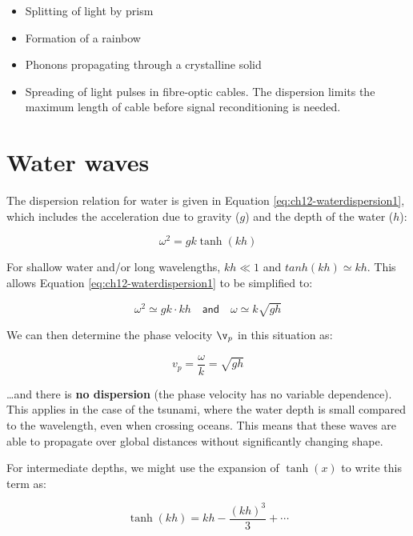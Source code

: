 \documentclass[
]{book}
\providecommand{\tightlist}{%
  \setlength{\itemsep}{0pt}\setlength{\parskip}{0pt}}
\begin{document}
\begin{itemize}
\tightlist
\item
  Splitting of light by prism
\item
  Formation of a rainbow
\item
  Phonons propagating through a crystalline solid
\item
  Spreading of light pulses in fibre-optic cables. The dispersion limits the maximum length of cable before signal reconditioning is needed.
\end{itemize}

\hypertarget{sec:ch12-waterwaves}{%
\section{Water waves}\label{sec:ch12-waterwaves}}

The dispersion relation for water is given in Equation \eqref{eq:ch12-waterdispersion1}, which includes the acceleration due to gravity (\(g\)) and the depth of the water (\(h\)):

\begin{equation}
\omega^2 = gk\tanh(kh)
\label{eq:ch12-waterdispersion1}
\end{equation}

For shallow water and/or long wavelengths, \(kh \ll 1\) and \(tanh(kh) \simeq kh\). This allows Equation \eqref{eq:ch12-waterdispersion1} to be simplified to:

\begin{equation}
\omega^2 \simeq gk \cdot kh \quad \textsf{and} \quad \omega \simeq k \sqrt{gh}
\end{equation}

We can then determine the phase velocity \(\v_p\) in this situation as:

\begin{equation}
v_p = \frac{\omega}{k} = \sqrt{gh}
\end{equation}

\ldots and there is \textbf{no dispersion} (the phase velocity has no variable dependence). This applies in the case of the tsunami, where the water depth is small compared to the wavelength, even when crossing oceans. This means that these waves are able to propagate over global distances without significantly changing shape.

For intermediate depths, we might use the expansion of \(\tanh(x)\) to write this term as:

\begin{equation}
\tanh(kh) = kh - \frac{(kh)^3}{3} + \cdots
\end{equation}
\end{document}
